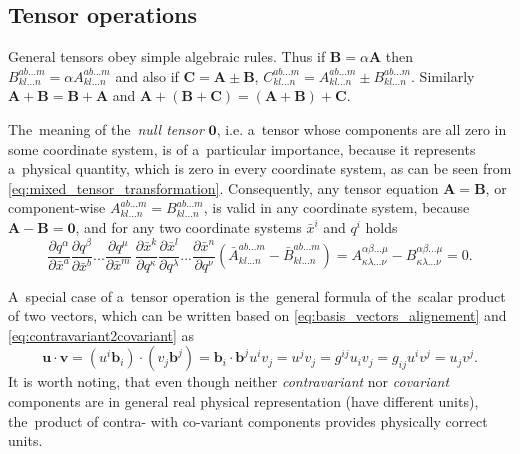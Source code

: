 \documentclass[preprint,12pt]{elsarticle}
\newcommand{\pdv}[2]{\frac{\partial{#1}}{\partial{#2}}}
\newcommand{\vect}[1]{\boldsymbol{#1}}
\newcommand{\matr}[1]{\mathbf{#1}}
\begin{document}
\subsection{Tensor operations} 
General tensors obey simple algebraic rules. Thus if 
$\matr{B} = \alpha \matr{A}$ then 
$B^{ab...m}_{kl...n} = \alpha A^{ab...m}_{kl...n}$ and also if
$\matr{C} = \matr{A}\pm\matr{B}$, 
$C^{ab...m}_{kl...n} = A^{ab...m}_{kl...n} \pm B^{ab...m}_{kl...n}$.
Similarly $\matr{A} + \matr{B} = \matr{B} + \matr{A}$ and
$\matr{A} + (\matr{B} + \matr{C}) = (\matr{A} + \matr{B}) + \matr{C}$.

The~meaning of the~\textit{null tensor} $\matr{0}$, i.e. a~tensor whose 
components are all zero in some coordinate system, 
is of a~particular importance,
because it represents a~physical quantity, which is zero in every coordinate
system, as can be seen from  \eqref{eq:mixed_tensor_transformation}.
Consequently, any tensor equation $\matr{A} = \matr{B}$, or component-wise
$A^{ab...m}_{kl...n} = B^{ab...m}_{kl...n}$, is valid in any coordinate system,
because $\matr{A} - \matr{B} = \matr{0}$, and for any two coordinate systems
$\bar{x}^i$ and $q^i$ holds
\begin{equation} 
  \pdv{q^\alpha}{\bar{x}^a} \pdv{q^\beta}{\bar{x}^b} ...
  \pdv{q^\mu}{\bar{x}^m}~
  \pdv{\bar{x}^k}{q^\kappa} \pdv{\bar{x}^l}{q^\lambda} ...
  \pdv{\bar{x}^n}{q^\nu} 
  (\bar{A}^{ab...m}_{kl...n} - \bar{B}^{ab...m}_{kl...n})
  = A^{\alpha\beta...\mu}_{\kappa\lambda...\nu} 
  - B^{\alpha\beta...\mu}_{\kappa\lambda...\nu} = 0 .
  \label{eq:tensor_equation}
\end{equation}

A~special case of a~tensor operation is the~general formula of the~scalar 
product of two vectors, which can be written based
on \eqref{eq:basis_vectors_alignement} and \eqref{eq:contravariant2covariant} as
\begin{equation}
  \vect{u}\cdot\vect{v} = (u^i \vect{b}_i)\cdot(v_j \vect{b}^j) 
  = \vect{b}_i\cdot\vect{b}^j u^i v_j = u^j v_j = g^{ij} u_i v_j = 
  g_{ij} u^i v^j = u_j v^j .
  \label{eq:general_scalar_product}
\end{equation} 
It is worth noting, that even though neither 
\textit{contravariant} nor \textit{covariant} components are in general
real physical representation (have different units), the~product of 
contra- with co-variant components provides physically correct units.
\end{document}
